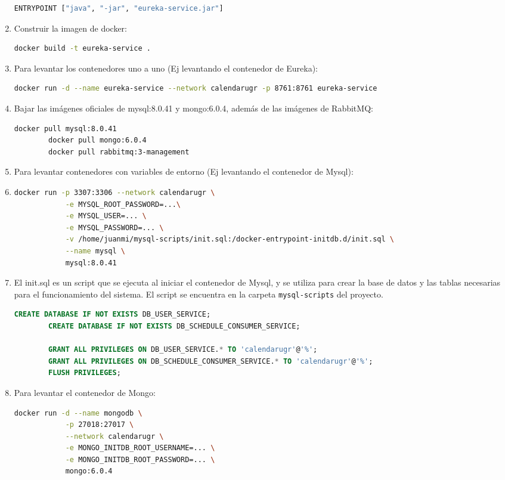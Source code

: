 \begin{enumerate}
\begin{lstlisting}[language=bash]
        ENTRYPOINT ["java", "-jar", "eureka-service.jar"]
    \end{lstlisting}
    \item Construir la imagen de docker:
    \begin{lstlisting}[language=bash]
        docker build -t eureka-service .
    \end{lstlisting}
    \item Para levantar los contenedores uno a uno (Ej levantando el contenedor de Eureka):
    \begin{lstlisting}[language=bash]
        docker run -d --name eureka-service --network calendarugr -p 8761:8761 eureka-service
    \end{lstlisting}
    \item Bajar las imágenes oficiales de mysql:8.0.41 y mongo:6.0.4, además de las imágenes de RabbitMQ:
    \begin{lstlisting}[language=bash]
        docker pull mysql:8.0.41
        docker pull mongo:6.0.4
        docker pull rabbitmq:3-management
    \end{lstlisting}
    \item Para levantar contenedores con variables de entorno (Ej levantando el contenedor de Mysql):
    \item \begin{lstlisting}[language=bash]
        docker run -p 3307:3306 --network calendarugr \
            -e MYSQL_ROOT_PASSWORD=...\
            -e MYSQL_USER=... \
            -e MYSQL_PASSWORD=... \
            -v /home/juanmi/mysql-scripts/init.sql:/docker-entrypoint-initdb.d/init.sql \
            --name mysql \
            mysql:8.0.41
    \end{lstlisting}
    \item El init.sql es un script que se ejecuta al iniciar el contenedor de Mysql, y se utiliza para crear la base de datos y las tablas necesarias para el funcionamiento del sistema. El script se encuentra en la carpeta \texttt{mysql-scripts} del proyecto.
    \begin{lstlisting}[language=sql]
        CREATE DATABASE IF NOT EXISTS DB_USER_SERVICE;
        CREATE DATABASE IF NOT EXISTS DB_SCHEDULE_CONSUMER_SERVICE;

        GRANT ALL PRIVILEGES ON DB_USER_SERVICE.* TO 'calendarugr'@'%';
        GRANT ALL PRIVILEGES ON DB_SCHEDULE_CONSUMER_SERVICE.* TO 'calendarugr'@'%';
        FLUSH PRIVILEGES;
    \end{lstlisting}
    \item Para levantar el contenedor de Mongo:
    \begin{lstlisting}[language=bash]
        docker run -d --name mongodb \
            -p 27018:27017 \
            --network calendarugr \
            -e MONGO_INITDB_ROOT_USERNAME=... \
            -e MONGO_INITDB_ROOT_PASSWORD=... \
            mongo:6.0.4
    \end{lstlisting}
\end{enumerate}

